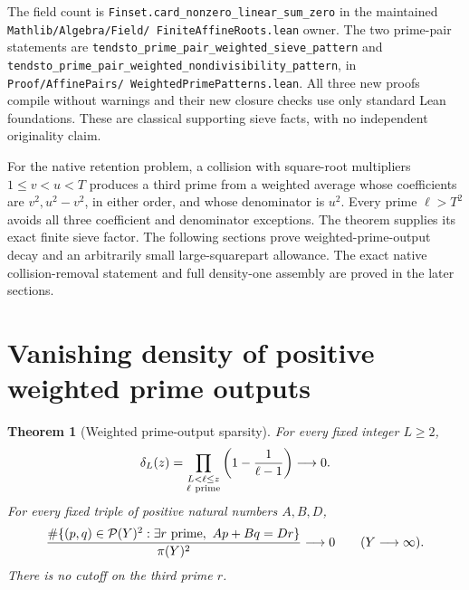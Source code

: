 \documentclass[11pt]{article}
\newtheorem{theorem}{Theorem}[section]
\begin{document}
The field count is
\texttt{Finset.card\_nonzero\_linear\_sum\_zero} in the maintained
\texttt{Mathlib/\allowbreak Algebra/\allowbreak Field/\allowbreak
FiniteAffineRoots.\allowbreak lean} owner.
The two prime-pair statements are
\texttt{tendsto\_prime\_pair\_weighted\_sieve\_pattern} and
\texttt{tendsto\_prime\_pair\_weighted\_nondivisibility\_pattern},
in \texttt{Proof/\allowbreak AffinePairs/\allowbreak
WeightedPrimePatterns.\allowbreak lean}.
All three new proofs compile without warnings and their new
closure checks use only standard Lean foundations.
These are classical supporting sieve facts, with no independent
originality claim.

For the native retention problem, a collision with square-root
multipliers \(1\le v<u<T\) produces a third prime from a weighted
average whose coefficients are \(v^2,u^2-v^2\), in either order,
and whose denominator is \(u^2\).
Every prime \(\ell>T^2\) avoids all three coefficient and
denominator exceptions. The theorem supplies its exact finite
sieve factor. The following sections prove weighted-prime-output
decay and an arbitrarily small large-squarepart allowance. The exact
native collision-removal statement and full density-one assembly
are proved in the later sections.

\section{Vanishing density of positive weighted prime outputs}
\label{sec:weighted-prime-output-decay}

\begin{theorem}[Weighted prime-output sparsity]
\label{thm:weighted-prime-output-sparse}
For every fixed integer \(L\ge2\),
\[
 \delta_L(z)=\prod_{\substack{L<\ell\le z\\ \ell\ {\rm prime}}}
       \left(1-\frac1{\ell-1}\right)\longrightarrow0.
\]
For every fixed triple of positive natural numbers \(A,B,D\),
\[
 \frac{\#\{(p,q)\in\mathcal P(Y)^2:
       \exists r\ {\rm prime},\ Ap+Bq=Dr\}}{\pi(Y)^2}
       \longrightarrow0
 \qquad(Y\longrightarrow\infty).
\]
There is no cutoff on the third prime \(r\).
\end{theorem}
\end{document}
